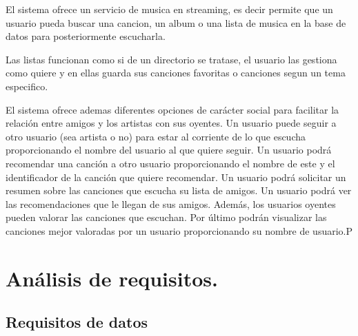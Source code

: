 \documentclass[12pt,a4paper]{article}
\begin{document}
El sistema ofrece un servicio de musica en streaming, es decir permite que un usuario pueda buscar una cancion, un album o una lista de musica en la base 
de datos para posteriormente escucharla. 

Las listas funcionan como si de un directorio se tratase, el usuario las gestiona como quiere y en ellas guarda sus canciones favoritas o canciones segun un tema especifico.  

El sistema ofrece ademas diferentes opciones de carácter social para facilitar la relación entre amigos y los artistas con sus oyentes. Un usuario puede seguir a otro usuario (sea artista o no) para estar al corriente de lo que escucha proporcionando el nombre del usuario al que quiere seguir. Un usuario podrá recomendar una canción a otro usuario proporcionando el nombre de este y el identificador de la canción que quiere recomendar. Un usuario podrá solicitar un resumen sobre las canciones que escucha su lista de amigos. 
Un usuario podrá ver las recomendaciones que le llegan de sus amigos. Además, los usuarios oyentes pueden valorar las canciones que escuchan. Por último podrán visualizar las canciones mejor valoradas por un usuario proporcionando su nombre de usuario.P

\section{Análisis de requisitos.}

\subsection{Requisitos de datos}
\end{document}

